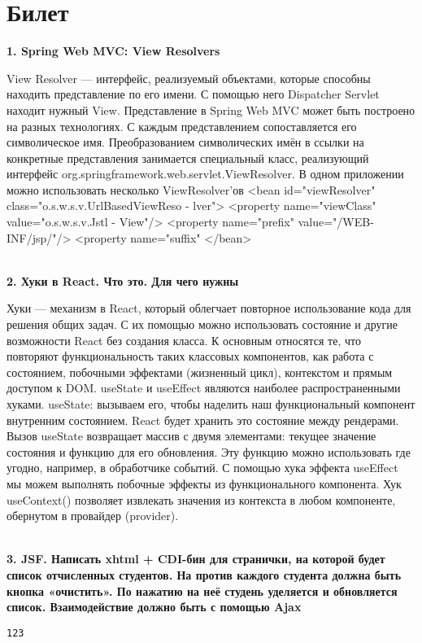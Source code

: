 \documentclass{article}
\newcommand{\bil}[5]{%
        \section{Билет}
        \textbf{1. #1}

        #4
        \\
        \textbf{2. #2}
        
        #5
        \\
        \textbf{3. #3}
}
\begin{document}
\bil{Spring Web MVC: View Resolvers}
{Хуки в React. Что это. Для чего нужны}
{JSF. Написать xhtml + CDI-бин для странички, на которой будет список отчисленных студентов. На против каждого студента должна быть кнопка «очистить». По нажатию на неё студень уделяется и обновляется список. Взаимодействие должно быть с помощью Ajax}{
    View Resolver — интерфейс, реализуемый объектами, которые способны находить представление по его имени. 
    С помощью него Dispatcher Servlet находит нужный View.
    Представление в Spring Web MVC может быть построено на разных технологиях.
    С каждым представлением сопоставляется его символическое имя.
    Преобразованием символических имён в ссылки на конкретные представления занимается специальный класс, реализующий интерфейс org.springframework.web.servlet.ViewResolver.
    В одном приложении можно использовать несколько ViewResolver'ов
    <bean id="viewResolver" class="o.s.w.s.v.UrlBasedViewReso - lver"> <property name="viewClass"
              value="o.s.w.s.v.Jstl - View"/>
    <property name="prefix"
              value="/WEB-INF/jsp/"/>
    <property name="suffix"
</bean>
}{
    Хуки — механизм в React, который облегчает повторное использование кода для решения общих задач. 
    С их помощью можно использовать состояние и другие возможности React без создания класса.
    К основным относятся те, что повторяют функциональность таких классовых компонентов, как работа с состоянием, побочными эффектами (жизненный цикл), контекстом и прямым доступом к DOM.
    useState и useEffect являются наиболее распространенными хуками.
    useState: вызываем его, чтобы наделить наш функциональный компонент внутренним состоянием. React будет хранить это состояние между рендерами. 
    Вызов useState возвращает массив с двумя элементами: текущее значение состояния и функцию для его обновления. 
    Эту функцию можно использовать где угодно, например, в обработчике событий. 
    С помощью хука эффекта useEffect мы можем выполнять побочные эффекты из функционального компонента.
    Хук useContext() позволяет извлекать значения из контекста в любом компоненте, обернутом в провайдер (provider).
}
\begin{lstlisting}[frame=single, basicstyle=\ttfamily, breaklines=true, breakatwhitespace=true, postbreak=\mbox{\textcolor{red}{$\hookrightarrow$}\space}]
123
\end{lstlisting}
\end{document}
